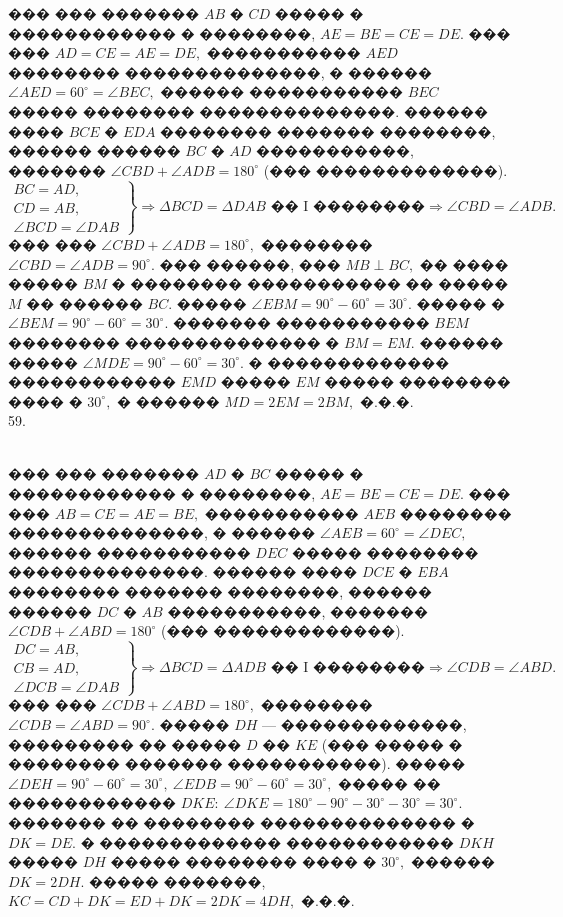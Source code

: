 \documentclass[12pt]{article}
\begin{document}
��� ��� ������� $AB$ � $CD$ ����� � ������������ � ��������, $AE=BE=CE=DE.$ ��� ��� $AD=CE=AE=DE,$ ����������� $AED$ �������� ��������������, � ������ $\angle AED=60^\circ=\angle BEC,$ ������ ����������� $BEC$ ����� �������� ��������������. ������ ���� $BCE$ � $EDA$ �������� ������� ��������, ������ ������ $BC$ � $AD$ �����������, ������� $\angle CBD+\angle ADB=180^\circ$ (��� �������������). $\left.\begin{array}{l}BC=AD,\\
CD=AB,\\
\angle BCD=\angle DAB  \end{array}\right\}\Rightarrow \Delta BCD=\Delta DAB\text{ �� I ��������}\Rightarrow \angle CBD=\angle ADB.$ ��� ��� $\angle CBD+\angle ADB=180^\circ,$ �������� $\angle CBD=\angle ADB=90^\circ.$ ��� ������, ��� $MB\perp BC,$ �� ���� ����� $BM$ � �������� ����������� �� ����� $M$ �� ������ $BC.$ ����� $\angle EBM=90^\circ-60^\circ=30^\circ.$ ����� � $\angle BEM=90^\circ-60^\circ=30^\circ.$ ������� ����������� $BEM$ �������� �������������� � $BM=EM.$ ������ ����� $\angle MDE=90^\circ-60^\circ=30^\circ.$ � ������������� ������������ $EMD$ ����� $EM$ ����� �������� ���� � $30^\circ,$ � ������ $MD=2EM=2BM,$ �.�.�.\\
59. \begin{figure}[ht!]
\end{figure}\\
��� ��� ������� $AD$ � $BC$ ����� � ������������ � ��������, $AE=BE=CE=DE.$ ��� ��� $AB=CE=AE=BE,$ ����������� $AEB$ �������� ��������������, � ������ $\angle AEB=60^\circ=\angle DEC,$ ������ ����������� $DEC$ ����� �������� ��������������. ������ ���� $DCE$ � $EBA$ �������� ������� ��������, ������ ������ $DC$ � $AB$ �����������, ������� $\angle CDB+\angle ABD=180^\circ$ (��� �������������). $\left.\begin{array}{l}DC=AB,\\
CB=AD,\\
\angle DCB=\angle DAB  \end{array}\right\}\Rightarrow \Delta BCD=\Delta ADB\text{ �� I ��������}\Rightarrow \angle CDB=\angle ABD.$ ��� ��� $\angle CDB+\angle ABD=180^\circ,$ �������� $\angle CDB=\angle ABD=90^\circ.$ ����� $DH$ --- �������������, ��������� �� ����� $D$ �� $KE$ (��� ����� � �������� ������� �����������). ����� $\angle DEH=90^\circ-60^\circ=30^\circ,\ \angle EDB=90^\circ-60^\circ=30^\circ,$ ����� �� ������������ $DKE:\ \angle DKE=180^\circ-90^\circ-30^\circ-30^\circ=30^\circ.$ ������� �� �������� �������������� � $DK=DE.$ � ������������� ������������ $DKH$ ����� $DH$ ����� �������� ���� � $30^\circ,$ ������ $DK=2DH.$ ����� �������, $KC=CD+DK=ED+DK=2DK=4DH,$ �.�.�.\\
\end{document}

